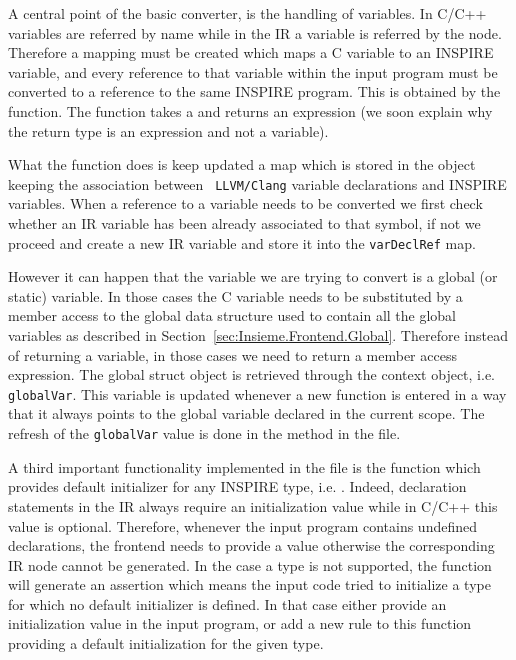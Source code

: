 A central point of the basic converter, is the handling of variables. In C/C++
variables are referred by name while in the IR a variable is referred by the
node. Therefore a mapping must be created which maps a C variable to an INSPIRE
variable, and every reference to that variable within the input program must be
converted to a reference to the same INSPIRE program. This is obtained by the
 function. The function takes a  and
returns an expression (we soon explain why the return type is an expression and
not a variable). 

What the function does is keep updated a map which is stored in the
 object keeping the association between {\tt
LLVM/Clang} variable declarations and INSPIRE variables. When a reference to a
variable  needs to be converted we first check whether
an IR variable has been already associated to that symbol, if not we proceed and
create a new IR variable and store it into the {\tt varDeclRef} map. 

However it can happen that the variable we are trying to convert is a global (or
static) variable. In those cases the C variable needs to be substituted by a
member access to the global data structure used to contain all the global
variables as described in Section~\ref{sec:Insieme.Frontend.Global}. Therefore
instead of returning a variable, in those cases we need to return a member
access expression. The global struct object is retrieved through the context
object, i.e. {\tt globalVar}. This variable is updated whenever a new function
is entered in a way that it always points to the global variable declared in the
current scope. The refresh of the {\tt globalVar} value is done in the
 method in the  file. 

A third important functionality implemented in the
 file is the function which provides default
initializer for any INSPIRE type, i.e. . Indeed,
declaration statements in the IR always require an initialization value while in
C/C++ this value is optional. Therefore, whenever the input program contains
undefined declarations, the frontend needs to provide a value otherwise the
corresponding IR node cannot be generated. In the case a type is not supported,
the function will generate an assertion which means the input code tried to
initialize a type for which no default initializer is defined. In that case
either provide an initialization value in the input program, or add a new rule
to this function providing a default initialization for the given type. 

